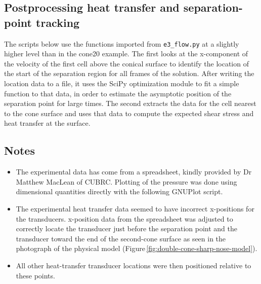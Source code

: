 \clearpage
\subsection{Postprocessing heat transfer and separation-point tracking}
\label{double-cone-sharp-nose-post-processing}
%
The scripts below use the functions imported from \texttt{e3\_flow.py}
at a slightly higher level than in the cone20 example.
The first looks at the x-component of the velocity of the first cell above the 
conical surface to identify the location of the start of the separation region
for all frames of the solution.
After writing the location data to a file, it uses the SciPy optimization module 
to fit a simple function to that data, 
in order to estimate the asymptotic position of the separation point for large times.
The second extracts the data for the cell nearest to the cone surface
and uses that data to compute the expected shear stress and heat transfer at the surface.

\noindent
\topbar

\bottombar

\noindent
\topbar

\bottombar

\subsection{Notes}
\begin{itemize}
 \item The experimental data has come from a spreadsheet, 
 kindly provided by Dr Matthew MacLean of CUBRC.
 Plotting of the pressure was done using dimensional quantities directly with the following GNUPlot script.
 
 \item The experimental heat transfer data seemed to have incorrect x-positions
 for the transducers.  
 x-position data from the spreadsheet was adjusted to correctly locate the transducer just before
 the separation point and the transducer toward the end of the second-cone surface as seen in
 the photograph of the physical model (Figure\,\ref{fig:double-cone-sharp-nose-model}).
 
 \item All other heat-transfer transducer locations were then positioned relative to these points.
 
\end{itemize}
